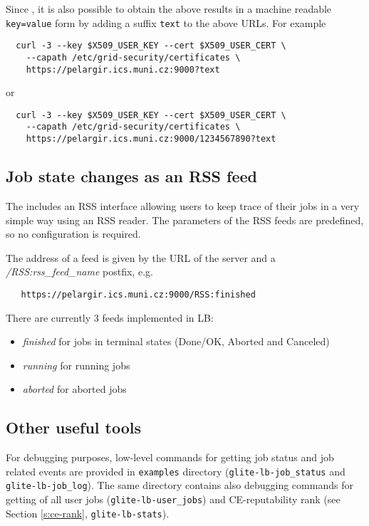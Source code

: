 Since \LBnew, it is also possible to obtain the above results in a machine readable 
\verb'key=value' form by adding a suffix \verb'text' to the above URLs. For example
\begin{verbatim}
  curl -3 --key $X509_USER_KEY --cert $X509_USER_CERT \
    --capath /etc/grid-security/certificates \ 
    https://pelargir.ics.muni.cz:9000?text
\end{verbatim}
or
\begin{verbatim}
  curl -3 --key $X509_USER_KEY --cert $X509_USER_CERT \
    --capath /etc/grid-security/certificates \ 
    https://pelargir.ics.muni.cz:9000/1234567890?text
\end{verbatim}

\subsection{Job state changes as an RSS feed}
The \LB includes an RSS interface allowing users to keep trace of their jobs in a very simple way using an RSS reader. The parameters of the RSS feeds are predefined, so no configuration is required.

The address of a feed is given by the URL of the \LB server and a \textit{/RSS:rss\_feed\_name} postfix, e.g.
\begin{verbatim}
   https://pelargir.ics.muni.cz:9000/RSS:finished
\end{verbatim}  

There are currently 3 feeds implemented in LB:
\begin{itemize}
 \item \textit{finished} for jobs in terminal states (Done/OK, Aborted and Canceled)
 \item \textit{running} for running jobs
 \item \textit{aborted} for aborted jobs
\end{itemize}

\subsection{Other useful tools}

For debugging purposes, low-level commands for getting \LB job status and job related events are provided in 
\verb'examples' directory (\verb'glite-lb-job_status' and \verb'glite-lb-job_log'). The same directory
contains also debugging commands for getting of all user jobs (\verb'glite-lb-user_jobs') and
CE-reputability rank (see Section \ref{s:ce-rank}, \verb'glite-lb-stats').

